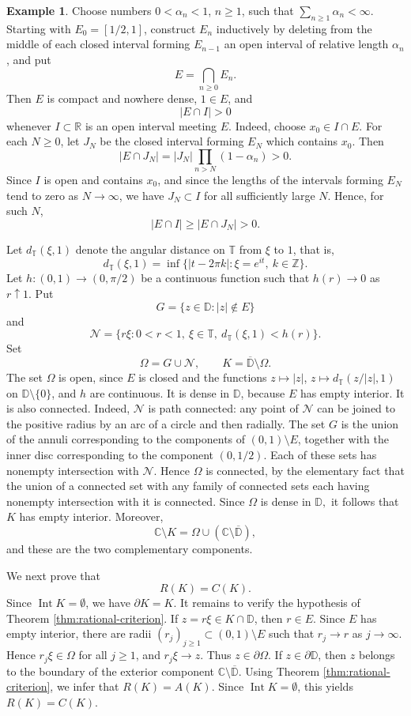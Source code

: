 \documentclass[11pt]{amsart}
\numberwithin{equation}{section}
\theoremstyle{definition}
\newtheorem{example}[theorem]{Example}
\theoremstyle{remark}
\newcommand{\CC}{\mathbb{C}}
\newcommand{\ZZ}{\mathbb{Z}}
\newcommand{\TT}{\mathbb{T}}
\newcommand{\DD}{\mathbb{D}}
\begin{document}
\begin{example}
\label{ex-non-dominating-hyponormal}
Choose numbers $0<\alpha_n<1$, $n\ge1$, such that
$\sum_{n\ge1}\alpha_n<\infty$. Starting with $E_0=[1/2,1]$, construct
$E_n$ inductively by deleting from the middle of each closed interval forming
$E_{n-1}$ an open interval of relative length $\alpha_n$, and put
\[
    E=\bigcap_{n\ge0}E_n .
\]
Then $E$ is compact and nowhere dense, $1\in E$, and
\[
    |E\cap I|>0
\]
whenever $I\subset\mathbb R$ is an open interval meeting $E$. Indeed, choose
$x_0\in I\cap E$. For each $N\ge0$, let $J_N$ be the closed interval forming
$E_N$ which contains $x_0$. Then
\[
    |E\cap J_N|=|J_N|\prod_{n>N}(1-\alpha_n)>0.
\]
Since $I$ is open and contains $x_0$, and since the lengths of the intervals
forming $E_N$ tend to zero as $N\to\infty$, we have $J_N\subset I$ for all
sufficiently large $N$. Hence, for such $N$,
\[
    |E\cap I|\ge |E\cap J_N|>0.
\]

Let $d_{\TT}(\xi,1)$ denote the angular distance on $\TT$ from $\xi$ to
$1$, that is,
\[
    d_{\TT}(\xi,1)=\inf\{|t-2\pi k|:\xi=e^{it},\ k\in\ZZ\} .
\]
Let $h:(0,1)\to(0,\pi/2)$ be a continuous function such that
$h(r)\to0$ as $r\uparrow1$.
 Put
\[
    G=\bigl\{z\in\mathbb D: |z|\notin E\bigr\}
\]
and
\[
    \mathcal N=\bigl\{r\xi:0<r<1,\ \xi\in\TT,\
    d_{\TT}(\xi,1)<h(r)\bigr\}.
\]
Set
\[
    \Omega=G\cup\mathcal N,
    \qquad K=\overline{\mathbb D}\setminus\Omega .
\]
The set $\Omega$ is open, since $E$ is closed and the functions
$z\mapsto |z|$, $z\mapsto d_{\TT}(z/|z|,1)$ on $\mathbb D\setminus\{0\}$,
and $h$ are continuous. It is dense in $\mathbb D$, because $E$ has empty
interior. It is also connected. Indeed, $\mathcal N$ is path connected: any
point of $\mathcal N$ can be joined to the positive radius by an arc of a
circle and then radially. The set $G$ is the union of the annuli corresponding
to the components of $(0,1)\setminus E$, together with the inner disc
corresponding to the component $(0,1/2)$. Each of these sets has nonempty
intersection with $\mathcal N$. Hence $\Omega$ is connected, by the elementary
fact that the union of a connected set with any family of connected sets each
having nonempty intersection with it is connected. Since $\Omega$ is dense in
$\mathbb D,$ it follows that $K$ has empty interior. Moreover,
\[
    \CC\setminus K=\Omega\cup(\CC\setminus\overline{\DD}),
\]
and these are the two complementary components.

We next prove that
\[
    R(K)=C(K).
\]
Since $\operatorname{Int}K=\emptyset$, we have $\partial K=K$. It remains to verify
the hypothesis of Theorem \ref{thm:rational-criterion}. If
$z=r\xi\in K\cap\mathbb D$, then $r\in E$. Since $E$ has empty interior,
there are radii $(r_j)_{j\ge1}\subset(0,1)\setminus E$ such that
$r_j\to r$ as $j\to\infty$. Hence $r_j\xi\in\Omega$ for all $j\ge1$, and
$r_j\xi\to z$. Thus $z\in\partial\Omega$. If $z\in\partial\mathbb D$, then
$z$ belongs to the boundary of the exterior component
$\mathbb C\setminus\overline{\mathbb D}$. Using Theorem
\ref{thm:rational-criterion}, we infer that $R(K)=A(K)$. Since
$\operatorname{Int}K=\emptyset$, this yields $R(K)=C(K)$.


\end{example}
\end{document}
